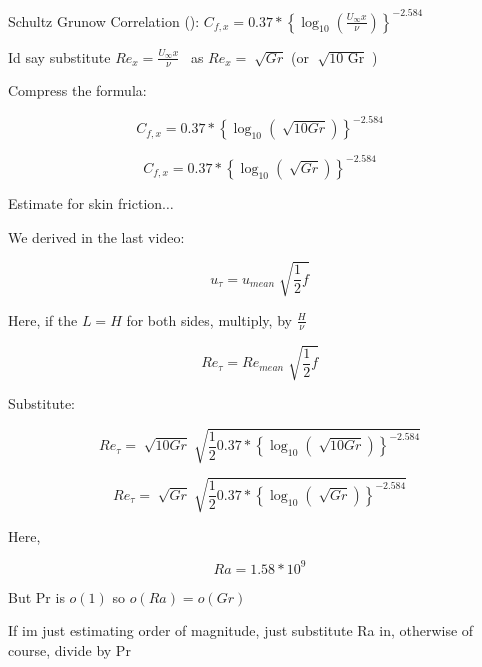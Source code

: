 \documentclass[12pt]{article}
\renewcommand{\_}{\kern-1.5pt\textunderscore\kern-1.5pt}
\begin{document}
Schultz Grunow Correlation (\cite{Bejan2013}): \( C_{f,x}=0.37\ast \left\lbrace \log _{10} \left( \frac{U_{\infty}x}{ \nu } \right)  \right\rbrace ^{-2.584} \)

Id say substitute  \( Re_{x}=\frac{U_{\infty}x}{ \nu } \) \  as  \( Re_{x}=\sqrt[]{Gr} \)  (or  \( \sqrt[]{\text{10 Gr}} \) ) \par


\vspace{\baselineskip}
Compress the formula:\par

 \[ C_{f,x}=0.37\ast \left\lbrace \log _{10} \left( \sqrt[]{10Gr} \right)  \right\rbrace ^{-2.584} \] \par

 \[ C_{f,x}=0.37\ast \left\lbrace \log _{10} \left( \sqrt[]{Gr} \right)  \right\rbrace ^{-2.584} \] \par

Estimate for skin friction$ \ldots $ \par

We derived in the last video:\par

 \[ u_{ \tau}=u_{mean}\sqrt[]{\frac{1}{2}f} \] \par

Here, if the  \( L=H \)  for both sides, multiply, by  \( \frac{H}{ \nu } \) \par

 \[ Re_{ \tau}=Re_{mean}\sqrt[]{\frac{1}{2}f} \] \par

Substitute:\par

 \[ Re_{ \tau}=\sqrt[]{10Gr}\sqrt[]{\frac{1}{2}0.37\ast \left\lbrace \log _{10} \left( \sqrt[]{10Gr} \right)  \right\rbrace ^{-2.584}} \] \par

 \[ Re_{ \tau}=\sqrt[]{Gr}\sqrt[]{\frac{1}{2}0.37\ast \left\lbrace \log _{10} \left( \sqrt[]{Gr} \right)  \right\rbrace ^{-2.584}} \] \par

Here, \par

 \[ Ra=1.58\ast10^{9} \] \par

But Pr is  \( o \left( 1 \right)  \)  so  \( o \left( Ra \right) =o \left( Gr \right)  \) \par

If im just estimating order of magnitude, just substitute Ra in, otherwise of course, divide by Pr\par
\end{document}
